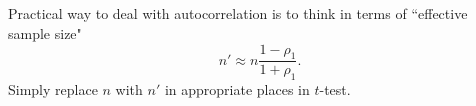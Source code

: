\documentclass{article}
\begin{document}
\subsection{\citet{wilks11}}
Practical way to deal with autocorrelation is to think in terms of ``effective sample size" 
\begin{equation}
n' \approx n \frac{1-\rho_1}{1+\rho_1}.
\end{equation} 
Simply replace $n$ with $n'$ in appropriate places in $t$-test. 

\subsection{\citet{miller03}}



\end{document}
